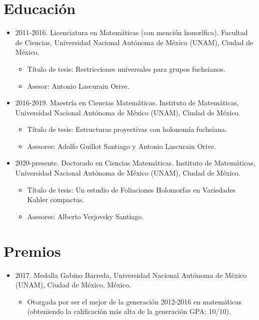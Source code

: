 \documentclass[11pt]{article}
\begin{document}
\section{Educación}
\label{sec:orgf4c6971}
\begin{itemize}
\item 2011-2016. Licenciatura en Matemáticas (con mención honorífica). Facultad de Ciencias, Universidad Nacional Autónoma de México (UNAM), Ciudad de México.
\begin{itemize}
\item Título de tesis: Restricciones universales para grupos fuchsianos.
\item Asesor: Antonio Lascurain Orive.
\end{itemize}

\item 2016-2019. Maestría en Ciencias Matemáticas. Instituto de Matemáticas, Universidad Nacional Autónoma de México (UNAM), Ciudad de México.
\begin{itemize}
\item Título de tesis: Estructuras proyectivas con holonomía fuchsiana.
\item Asesores: Adolfo Guillot Santiago y Antonio Lascurain Orive.
\end{itemize}

\item 2020-presente. Doctorado en Ciencias Matemáticas. Instituto de Matemáticas, Universidad Nacional Autónoma de México (UNAM), Ciudad de México.
\begin{itemize}
\item Título de tesis: Un estudio de Foliaciones Holomorfas en Variedades Kahler compactas.
\item Asesores: Alberto Verjovsky Santiago.
\end{itemize}
\end{itemize}

\section{Premios}
\label{sec:orgab8a99c}
\begin{itemize}
\item 2017. Medalla Gabino Barreda, Universidad Nacional Autónoma de México (UNAM), Ciudad de México, México.
\begin{itemize}
\item Otorgada por ser el mejor de la generación 2012-2016 en matemáticas (obteniendo la calificación más alta de la generación GPA: 10/10).
\end{itemize}
\end{itemize}
\end{document}
